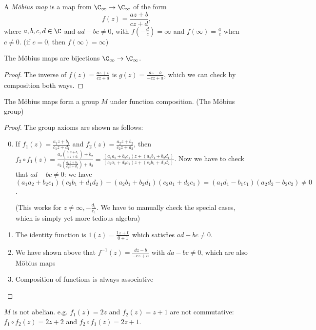 \documentclass[a4pape]{article}
\begin{document}
\begin{defi}
  A \emph{M\"obius map} is a map from $\C_\infty \to \C_\infty$ of the form
  \[
  f(z) = \frac{az + b}{cz + d},
  \]
where $a, b, c, d\in \C$ and $ad - bc\not= 0$, with $f(-\frac{d}{c}) = \infty$ and $f(\infty) = \frac{a}{c}$ when $c\not= 0$. (if $c = 0$, then $f(\infty)=\infty$)
\end{defi}

\begin{lemma}
  The M\"obius maps are bijections $\C_\infty \to \C_\infty$. 
\end{lemma}

\begin{proof}
  The inverse of $f(z) = \frac{az + b}{cz+ d}$ is $g(z) = \frac{dz - b}{-cz + a}$, which we can check by composition both ways.
\end{proof}

\begin{prop}
  The M\"obius maps form a group $M$ under function composition. (The M\"obius group)
\end{prop}
\begin{proof}
  The group axioms are shown as follows:
  \begin{enumerate}[label=\arabic{*}.]
    \setcounter{enumi}{-1}
  \item If $f_1(z) = \frac{a_1z + b_1}{c_1z + d_1}$ and $f_2(z) = \frac{a_2z + b_2}{c_2 z + d_2}$, then $\displaystyle f_2\circ f_1 (z) = \frac{a_2\left(\frac{a_1z + b_1}{c_1z + d_1}\right) + b_2}{c_2\left(\frac{a_1z + b_1}{c_1z + d_1}\right) + d_2} = \frac{(a_1a_2 + b_2c_1)z + (a_2b_1 + b_2d_1)}{(c_2a_1 + d_2c_1)z + (c_2b_1 + d_1d_2)}$. Now we have to check that $ad - bc \not = 0$: we have $(a_1a_2 + b_2c_1)(c_2b_1 + d_1d_2) - (a_2b_1 + b_2d_1)(c_2a_1 + d_2c_1) = (a_1d_1 - b_1c_1)(a_2d_2 - b_2c_2)\not =0 $.

    (This works for $z\not= \infty, -\frac{d_1}{c_1}$. We have to manually check the special cases, which is simply yet more tedious algebra)
  \item The identity function is $1(z) = \frac{1z + 0}{0 + 1}$ which satisfies $ad - bc \not= 0$.
  \item We have shown above that $f^{-1}(z) = \frac{dz - b}{-cz + a}$ with $da - bc\not= 0$, which are also M\"obius maps
  \item Composition of functions is always associative
  \end{enumerate}
\end{proof}
\note $M$ is not abelian. e.g. $f_1(z) = 2z$ and $f_2(z) = z + 1$ are not commutative: $f_1\circ f_2(z) = 2z+2$ and $f_2\circ f_1(z) = 2z + 1$.
\end{document}
